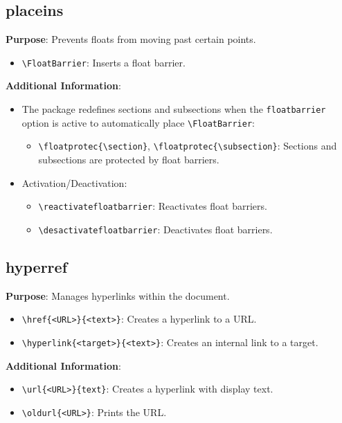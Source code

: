 \documentclass[12pt,twoside]{report}
\begin{document}
\subsection{placeins}
\textbf{Purpose}: Prevents floats from moving past certain points.
\begin{itemize}
    \item \verb|\FloatBarrier|: Inserts a float barrier.
\end{itemize}
\textbf{Additional Information}:
\begin{itemize}
    \item The package redefines sections and subsections when the \texttt{floatbarrier} option is active to automatically place \verb|\FloatBarrier|:
    \begin{itemize}
        \item \verb|\floatprotec{\section}|, \verb|\floatprotec{\subsection}|: Sections and subsections are protected by float barriers.
    \end{itemize}
    \item Activation/Deactivation:
    \begin{itemize}
        \item \verb|\reactivatefloatbarrier|: Reactivates float barriers.
        \item \verb|\desactivatefloatbarrier|: Deactivates float barriers.
    \end{itemize}
\end{itemize}

\subsection{hyperref}
\textbf{Purpose}: Manages hyperlinks within the document.
\begin{itemize}
    \item \verb|\href{<URL>}{<text>}|: Creates a hyperlink to a URL.
    \item \verb|\hyperlink{<target>}{<text>}|: Creates an internal link to a target.
\end{itemize}
\textbf{Additional Information}:
\begin{itemize}
    \item \verb|\url{<URL>}{text}|: Creates a hyperlink with display text.
    \item \verb|\oldurl{<URL>}|: Prints the URL.
\end{itemize}
\end{document}
